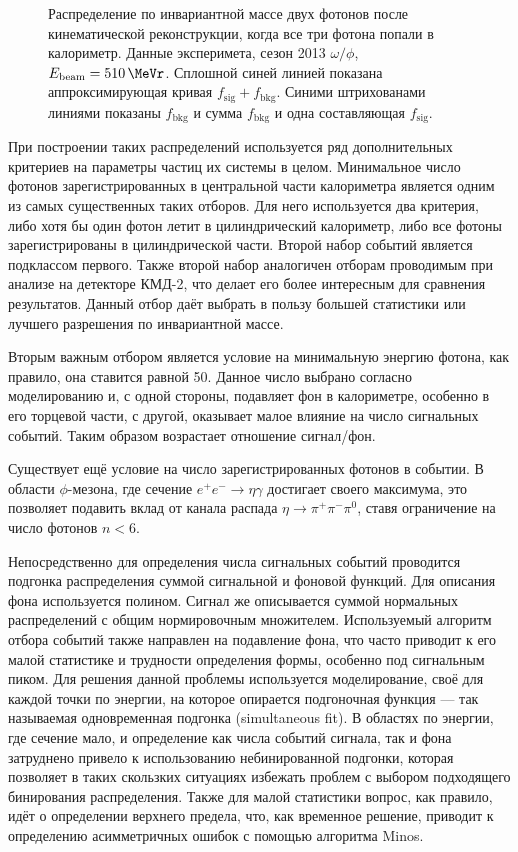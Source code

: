 \begin{figure}
\begin{minipage}[T]{.48\textwidth}
		\caption{Распределение по инвариантной массе двух фотонов после кинематической реконструкции,
			когда все три фотона попали в  калориметр.
			Данные эксперимета, сезон 2013 $\omega / \phi$, $E_{\text{beam}} = \SI{510}{\MeVr}$.
			Сплошной синей линией показана аппроксимирующая кривая $f_{\text{sig}} + f_{\text{bkg}}$.
			Синими штрихованами линиями показаны $f_{\text{bkg}}$ и сумма $f_{\text{bkg}}$ и одна составляющая $f_{\text{sig}}$.}
	\end{minipage}
\end{figure}

При построении таких распределений используется ряд дополнительных критериев на параметры частиц их системы в целом.
Минимальное число фотонов зарегистрированных в центральной части калориметра является одним из самых существенных таких отборов.
Для него используется два критерия,
либо хотя бы один фотон летит в цилиндрический калориметр,
либо все фотоны зарегистрированы в цилиндрической части.
Второй набор событий является подклассом первого.
Также второй набор аналогичен отборам проводимым при анализе на детекторе КМД-2,
что делает его более интересным для сравнения результатов.
Данный отбор даёт выбрать в пользу большей статистики или лучшего разрешения по инвариантной массе.

Вторым важным отбором является условие на минимальную энергию фотона,
как правило, она ставится равной \SI{50}{\MeVr}.
Данное число выбрано согласно моделированию и,
с одной стороны, подавляет фон в калориметре,
особенно в его торцевой части, с другой,
оказывает малое влияние на число сигнальных событий.
Таким образом возрастает отношение сигнал/фон.

Существует ещё условие на число зарегистрированных фотонов в событии.
В области $\phi$-мезона,
где сечение $e^+ e^- \to \eta \gamma$ достигает своего максимума,
это позволяет подавить вклад от канала распада $\eta \to \pi^+\pi^-\pi^0$,
ставя ограничение на число фотонов $n < 6$.

Непосредственно для определения числа сигнальных событий проводится подгонка распределения суммой сигнальной и фоновой функций.
Для описания фона используется полином.
Сигнал же описывается суммой нормальных распределений с общим нормировочным множителем.
Используемый алгоритм отбора событий также направлен на подавление фона,
что часто приводит к его малой статистике и трудности определения формы,
особенно под сигнальным пиком.
Для решения данной проблемы используется моделирование,
своё для каждой точки по энергии,
на которое опирается подгоночная функция --- так называемая одновременная подгонка (simultaneous fit).
В областях по энергии, где сечение мало,
и определение как числа событий сигнала,
так и фона затруднено привело к использованию небинированной подгонки,
которая позволяет в таких скользких ситуациях избежать проблем с выбором подходящего бинирования распределения.
Также для малой статистики вопрос, как правило,
идёт о определении верхнего предела, что, как временное решение,
приводит к определению асимметричных ошибок с помощью алгоритма Minos.